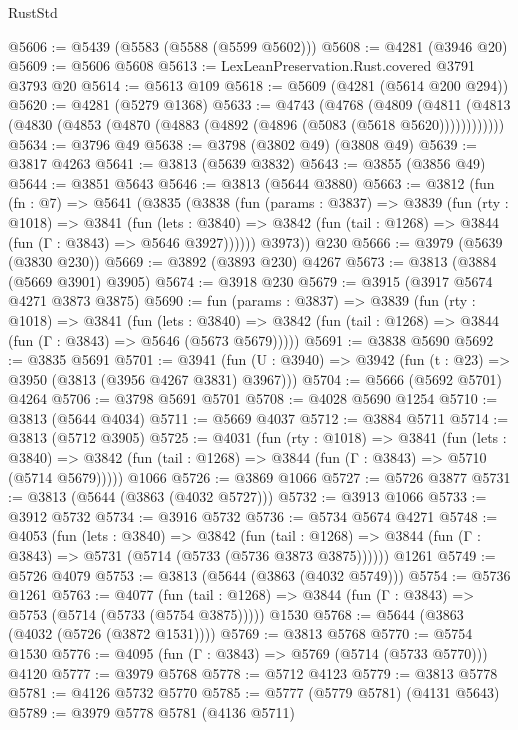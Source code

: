 \begin{lexlean}{RustStd}
\begin{coremodule}
@5606 := @5439 (@5583 (@5588 (@5599 @5602)))
@5608 := @4281 (@3946 @20)
@5609 := @5606 @5608
@5613 := LexLeanPreservation.Rust.covered @3791 @3793 @20
@5614 := @5613 @109
@5618 := @5609 (@4281 (@5614 @200 @294))
@5620 := @4281 (@5279 @1368)
@5633 := @4743
    (@4768
      (@4809 (@4811 (@4813 (@4830 (@4853 (@4870 (@4883 (@4892 (@4896 (@5083 (@5618 @5620))))))))))))
@5634 := @3796 @49
@5638 := @3798 (@3802 @49) (@3808 @49)
@5639 := @3817 @4263
@5641 := @3813 (@5639 @3832)
@5643 := @3855 (@3856 @49)
@5644 := @3851 @5643
@5646 := @3813 (@5644 @3880)
@5663 := @3812
    (fun (fn : @7) =>
    @5641
      (@3835
        (@3838
          (fun (params : @3837) =>
          @3839
            (fun (rty : @1018) =>
            @3841
              (fun (lets : @3840) =>
              @3842 (fun (tail : @1268) => @3844 (fun (Γ : @3843) => @5646 @3927))))))
        @3973))
    @230
@5666 := @3979 (@5639 (@3830 @230))
@5669 := @3892 (@3893 @230) @4267
@5673 := @3813 (@3884 (@5669 @3901) @3905)
@5674 := @3918 @230
@5679 := @3915 (@3917 @5674 @4271 @3873 @3875)
@5690 := fun (params : @3837) =>
  @3839
    (fun (rty : @1018) =>
    @3841
      (fun (lets : @3840) =>
      @3842 (fun (tail : @1268) => @3844 (fun (Γ : @3843) => @5646 (@5673 @5679)))))
@5691 := @3838 @5690
@5692 := @3835 @5691
@5701 := @3941 (fun (U : @3940) => @3942 (fun (t : @23) => @3950 (@3813 (@3956 @4267 @3831) @3967)))
@5704 := @5666 (@5692 @5701) @4264
@5706 := @3798 @5691 @5701
@5708 := @4028 @5690 @1254
@5710 := @3813 (@5644 @4034)
@5711 := @5669 @4037
@5712 := @3884 @5711
@5714 := @3813 (@5712 @3905)
@5725 := @4031
    (fun (rty : @1018) =>
    @3841
      (fun (lets : @3840) =>
      @3842 (fun (tail : @1268) => @3844 (fun (Γ : @3843) => @5710 (@5714 @5679)))))
    @1066
@5726 := @3869 @1066
@5727 := @5726 @3877
@5731 := @3813 (@5644 (@3863 (@4032 @5727)))
@5732 := @3913 @1066
@5733 := @3912 @5732
@5734 := @3916 @5732
@5736 := @5734 @5674 @4271
@5748 := @4053
    (fun (lets : @3840) =>
    @3842
      (fun (tail : @1268) => @3844 (fun (Γ : @3843) => @5731 (@5714 (@5733 (@5736 @3873 @3875))))))
    @1261
@5749 := @5726 @4079
@5753 := @3813 (@5644 (@3863 (@4032 @5749)))
@5754 := @5736 @1261
@5763 := @4077
    (fun (tail : @1268) => @3844 (fun (Γ : @3843) => @5753 (@5714 (@5733 (@5754 @3875)))))
    @1530
@5768 := @5644 (@3863 (@4032 (@5726 (@3872 @1531))))
@5769 := @3813 @5768
@5770 := @5754 @1530
@5776 := @4095 (fun (Γ : @3843) => @5769 (@5714 (@5733 @5770))) @4120
@5777 := @3979 @5768
@5778 := @5712 @4123
@5779 := @3813 @5778
@5781 := @4126 @5732 @5770
@5785 := @5777 (@5779 @5781) (@4131 @5643)
@5789 := @3979 @5778 @5781 (@4136 @5711)

\end{coremodule}
\end{lexlean}
